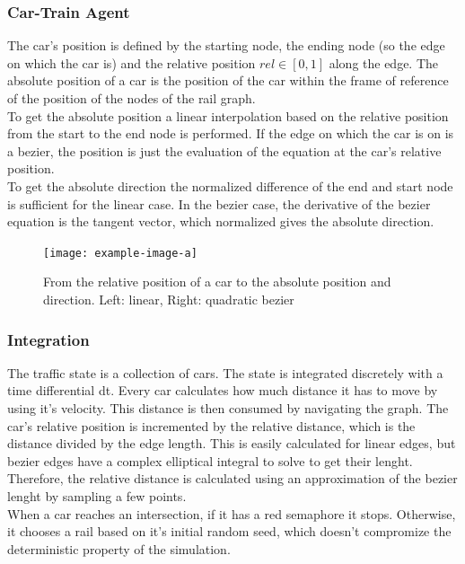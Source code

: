 \documentclass{article}
\begin{document}
\subsubsection{Car-Train Agent}
The car's position is defined by the starting node, the ending node (so the edge on which the car is) and the relative position \begin{math}{rel \in [0, 1]}\end{math} along the edge. The absolute position of a car is the position of the car within the frame of reference of the position of the nodes of the rail graph.\\
To get the absolute position a linear interpolation based on the relative position from the start to the end node is performed. If the edge on which the car is on is a bezier, the position is just the evaluation of the equation at the car's relative position.\\
To get the absolute direction the normalized difference of the end and start node is sufficient for the linear case. In the bezier case, the derivative of the bezier equation is the tangent vector, which normalized gives the absolute direction.
\begin{figure}[H]
\texttt{[image: example-image-a]}
\caption{From the relative position of a car to the absolute position and direction. Left: linear, Right: quadratic bezier}
\end{figure}

\subsubsection{Integration}
The traffic state is a collection of cars. The state is integrated discretely with a time differential dt. Every car calculates how much distance it has to move by using it's velocity. This distance is then consumed by navigating the graph. The car's relative position is incremented by the relative distance, which is the distance divided by the edge length. This is easily calculated for linear edges, but bezier edges have a complex elliptical integral to solve to get their lenght. Therefore, the relative distance is calculated using an approximation of the bezier lenght by sampling a few points. \\
When a car reaches an intersection, if it has a red semaphore it stops. Otherwise, it chooses a rail based on it's initial random seed, which doesn't compromize the deterministic property of the simulation.
\end{document}
